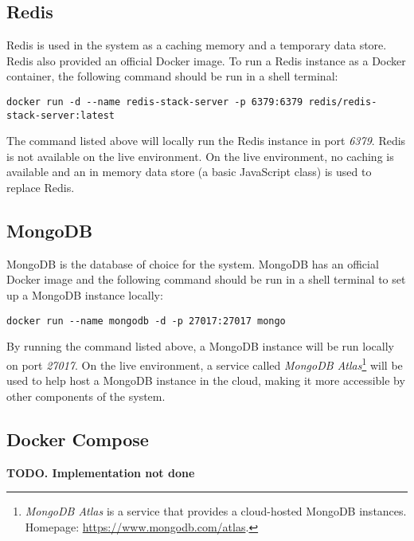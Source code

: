  \subsection{Redis}
 Redis is used in the system as a caching memory and a temporary data store. Redis also provided an official Docker image. To run a Redis instance as a Docker container, the following command should be run in a shell terminal:

 \begin{lstlisting}[caption={Running a Redis instance with Docker (Shell)}]
 docker run -d --name redis-stack-server -p 6379:6379 redis/redis-stack-server:latest
 \end{lstlisting}

 The command listed above will locally run the Redis instance in port \emph{6379}. Redis is not available on the live environment. On the live environment, no caching is available and an in memory data store (a basic JavaScript class) is used to replace Redis.

 \subsection{MongoDB}
 MongoDB is the database of choice for the system. MongoDB has an official Docker image and the following command should be run in a shell terminal to set up a MongoDB instance locally:

 \begin{lstlisting}[caption={Running a MongoDB instance with Docker (Shell)}]
 docker run --name mongodb -d -p 27017:27017 mongo 
 \end{lstlisting}

 By running the command listed above, a MongoDB instance will be run locally on port \emph{27017}. On the live environment, a service called \emph{MongoDB Atlas}\footnote{\emph{MongoDB Atlas} is a service that provides a cloud-hosted MongoDB instances. Homepage: \url{https://www.mongodb.com/atlas}.} will be used to help host a MongoDB instance in the cloud, making it more accessible by other components of the system.

 \subsection{Docker Compose}
 \textbf{TODO. Implementation not done}

